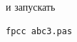 \documentclass[unicode, 12pt, a4paper,oneside,fleqn]{article}
\begin{document}
\begin{enumerate}
и запускать
\begin{verbatim}
fpcc abc3.pas
\end{verbatim}

%
%

\end{enumerate}
\end{document}
